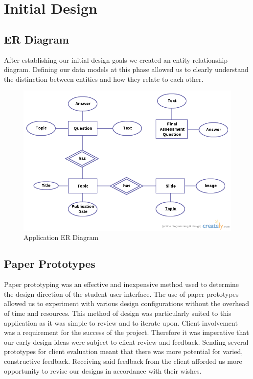 \documentclass{l3proj}
\begin{document}
\section{Initial Design}

\subsection{ER Diagram}
	
After establishing our initial design goals we created an entity relationship diagram. Defining our data models at this phase allowed us to clearly understand the distinction between entities and how they relate to each other.

\begin{figure}[!htb]
\caption{Application ER Diagram}
\includegraphics[width=\linewidth]{images/ERDiagram.png}
\end{figure}

\subsection{Paper Prototypes}

Paper prototyping was an effective and inexpensive method used to determine the design direction of the student user interface. The use of paper prototypes allowed us to experiment with various design configurations without the overhead of time and resources. This method of design was particularly suited to this application as it was simple to review and to iterate upon. Client involvement was a requirement for the success of the project. Therefore it was imperative that our early design ideas were subject to client review and feedback. Sending several prototypes for client evaluation meant that there was more potential for varied, constructive feedback. Receiving said feedback from the client afforded us more opportunity to revise our designs in accordance with their wishes. 
\end{document}
